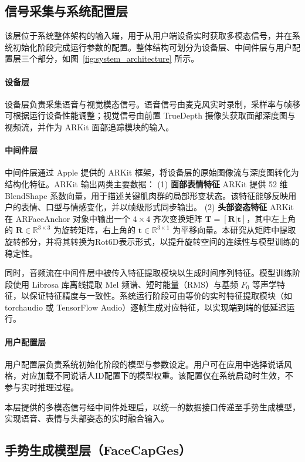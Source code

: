 \subsection{信号采集与系统配置层}
该层位于系统整体架构的输入端，用于从用户端设备实时获取多模态信号，并在系统初始化阶段完成运行参数的配置。整体结构可划分为设备层、中间件层与用户配置层三个部分，如图~\ref{fig:system_architecture} 所示。

\paragraph{设备层}
设备层负责采集语音与视觉模态信号。语音信号由麦克风实时录制，采样率与帧移可根据运行设备性能调整；视觉信号由前置 TrueDepth 摄像头获取面部深度图与视频流，并作为 ARKit 面部追踪模块的输入。

\paragraph{中间件层}
中间件层通过 Apple 提供的 ARKit 框架，将设备层的原始图像流与深度图转化为结构化特征。ARKit 输出两类主要数据：  
(1) \textbf{面部表情特征} ARKit 提供 52 维 BlendShape 系数向量，用于描述关键肌肉群的局部形变状态。该特征能够反映用户的表情、口型与情感变化，并以帧级形式同步输出。  
(2) \textbf{头部姿态特征} ARKit 在 ARFaceAnchor 对象中输出一个 $4\times4$ 齐次变换矩阵 $\mathbf{T}=[\mathbf{R}|\mathbf{t}]$，其中左上角的 $\mathbf{R}\in\mathbb{R}^{3\times3}$ 为旋转矩阵，右上角的 $\mathbf{t}\in\mathbb{R}^{3\times1}$ 为平移向量。本研究从矩阵中提取旋转部分，并将其转换为Rot6D\cite{rot6d}表示形式，以提升旋转空间的连续性与模型训练的稳定性。  

同时，音频流在中间件层中被传入特征提取模块以生成时间序列特征。模型训练阶段使用 Librosa 库离线提取 Mel 频谱、短时能量（RMS）与基频 $F_0$ 等声学特征，以保证特征精度与一致性。系统运行阶段可由等价的实时特征提取模块（如 torchaudio 或 TensorFlow Audio）逐帧生成对应特征，以实现端到端的低延迟运行。

\paragraph{用户配置层}
用户配置层负责系统初始化阶段的模型与参数设定。用户可在应用中选择说话风格，对应加载不同说话人ID配置下的模型权重。该配置仅在系统启动时生效，不参与实时推理过程。

本层提供的多模态信号经中间件处理后，以统一的数据接口传递至手势生成模型，实现语音、表情与头部姿态的实时融合输入。

\subsection{手势生成模型层（FaceCapGes）}

